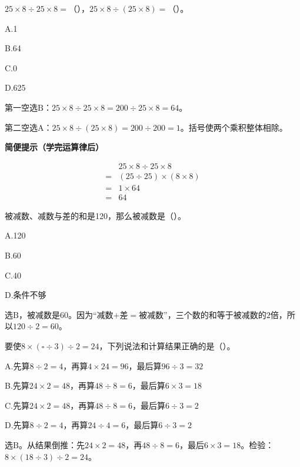 \(25\times8\div25\times8=\)（\hspace{1.8em}），\allowbreak{}\(25\times8\div(25\times8)=\)（\hspace{1.8em}）。\par
\noindent A.1\par
\noindent B.64\par
\noindent C.0\par
\noindent D.625\par
\begin{BookAnswer}
第一空选\(\mathrm B\)：\(25\times8\div25\times8=200\div25\times8=64\)。\par 第二空选\(\mathrm A\)：\(25\times8\div(25\times8)=200\div200=1\)。括号使两个乘积整体相除。\par\textbf{简便提示（学完运算律后）}\par \[\begin{aligned}&25\times8\div25\times8\\={}&(25\div25)\times(8\times8)\\={}&1\times64\\={}&64\end{aligned}\]
\end{BookAnswer}

被减数、减数与差的和是120，那么被减数是（\hspace{1.8em}）。\par
\noindent A.120\par
\noindent B.60\par
\noindent C.40\par
\noindent D.条件不够\par
\begin{BookAnswer}
选\(\mathrm B\)，被减数是\(60\)。因为“减数\(+\)差\(=\)被减数”，三个数的和等于被减数的\(2\)倍，所以\(120\div2=60\)。
\end{BookAnswer}

要使\(8\times(\square\div3)\div2=24\)，下列说法和计算结果正确的是（\hspace{1.8em}）。\par
\noindent A.先算\(8\div2=4\)，再算\(4\times24=96\)，最后算\(96\div3=32\)\par
\noindent B.先算\(24\times2=48\)，再算\(48\div8=6\)，最后算\(6\times3=18\)\par
\noindent C.先算\(24\times2=48\)，再算\(48\div8=6\)，最后算\(6\div3=2\)\par
\noindent D.先算\(8\div2=4\)，再算\(24\div4=6\)，最后算\(6\div3=2\)\par
\begin{BookAnswer}
选\(\mathrm B\)。从结果倒推：先\(24\times2=48\)，再\(48\div8=6\)，最后\(6\times3=18\)。检验：\(8\times(18\div3)\div2=24\)。
\end{BookAnswer}

